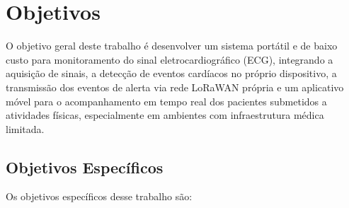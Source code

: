 \section{Objetivos}
\label{sec:objetivos}

O objetivo geral deste trabalho é desenvolver um sistema portátil e de baixo custo para monitoramento do sinal eletrocardiográfico (ECG), integrando a aquisição de sinais, a detecção de eventos cardíacos no próprio dispositivo, a transmissão dos eventos de alerta via rede LoRaWAN própria e um aplicativo móvel para o acompanhamento em tempo real dos pacientes submetidos a atividades físicas, especialmente em ambientes com infraestrutura médica limitada.


\subsection{Objetivos Específicos}
\label{sec:objetivosEspecificos}

Os objetivos específicos desse trabalho são:


